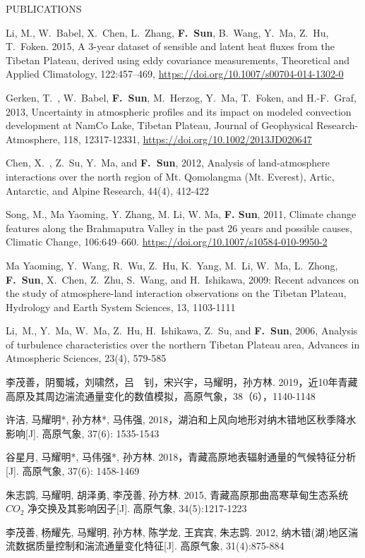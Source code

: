 \documentclass{resume} %
\begin{document}
\begin{rSection}{PUBLICATIONS}
\begin{etaremune}
  \item Li, M., W.~Babel, X.~Chen, L.~Zhang, {\bf F.~Sun}, B.~Wang, Y.~Ma, Z.~Hu, T.~Foken. 2015, A 3-year dataset of sensible and latent heat fluxes from the Tibetan Plateau, derived using eddy covariance measurements, Theoretical and Applied Climatology, 122:457–469, \url{https://doi.org/10.1007/s00704-014-1302-0}
  \item Gerken, T.~, W.~Babel, {\bf F.~Sun}, M.~Herzog, Y.~Ma, T.~Foken, and H.-F.~Graf, 2013, Uncertainty in atmospheric profiles and its impact on modeled convection development at NamCo Lake, Tibetan Plateau, Journal of Geophysical Research-Atmosphere, 118, 12317-12331, \url{https://doi.org/10.1002/2013JD020647}
  \item Chen, X.~, Z.~Su, Y.~Ma, and {\bf F.~Sun}, 2012, Analysis of land-atmosphere interactions over the north region of Mt. Qomolangma (Mt. Everest), Artic, Antarctic, and Alpine Research, 44(4), 412-422
  \item  Song, M., Ma Yaoming, Y. Zhang, M. Li, W. Ma, {\bf F. Sun}, 2011, Climate change features along the Brahmaputra Valley in the past 26 years and possible causes, Climatic Change, 106:649–660. \url{https://doi.org/10.1007/s10584-010-9950-2}
  \item Ma Yaoming, Y.~Wang, R.~Wu, Z.~Hu, K.~Yang, M.~Li, W.~Ma, L.~Zhong, {\bf F.~Sun}, X.~Chen, Z.~Zhu, S.~Wang, and H.~Ishikawa, 2009: Recent advances on the study of atmosphere-land interaction observations on the Tibetan Plateau, Hydrology and Earth System Sciences, 13, 1103-1111
  \item Li,~M., Y.~Ma, W.~Ma, Z.~Hu, H.~Ishikawa, Z.~Su, and {\bf F.~Sun}, 2006, Analysis of turbulence characteristics over the northern Tibetan Plateau area, Advances in Atmospheric Sciences, 23(4), 579-585
  \item 李茂善，阴蜀城，刘啸然，吕　钊，宋兴宇，马耀明，孙方林. 2019，近10年青藏高原及其周边湍流通量变化的数值模拟，高原气象，38（6），1140-1148
  \item  许洁, 马耀明*, 孙方林*, 马伟强, 2018，湖泊和上风向地形对纳木错地区秋季降水影响[J]. 高原气象, 37(6): 1535-1543
  \item 谷星月, 马耀明*, 马伟强*, 孙方林. 2018，青藏高原地表辐射通量的气候特征分析[J]. 高原气象, 37(6): 1458-1469
  \item 朱志鹍, 马耀明, 胡泽勇, 李茂善, 孙方林. 2015, 青藏高原那曲高寒草甸生态系统$CO_2$ 净交换及其影响因子[J]. 高原气象, 34(5):1217-1223
  \item 李茂善, 杨耀先, 马耀明, 孙方林, 陈学龙, 王宾宾, 朱志鹍. 2012, 纳木错(湖)地区湍流数据质量控制和湍流通量变化特征[J]. 高原气象, 31(4):875-884

\end{etaremune}
\end{rSection}
\end{document}
